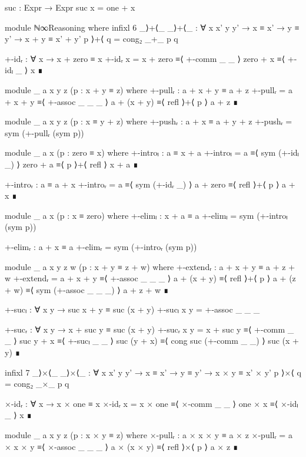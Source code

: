 \begin{code}[hide]
  suc : Expr → Expr
  suc x = one + x

  module ℕ∞Reasoning where
    infixl 6 _⟩+⟨_
    _⟩+⟨_ : ∀ {x x' y y'} → x ≡ x' → y ≡ y' → x + y ≡ x' + y'
    p ⟩+⟨ q = cong₂ _+_ p q

    +-idᵣ : ∀ x → x + zero ≡ x
    +-idᵣ x =
      x + zero ≡⟨ +-comm _ _ ⟩
      zero + x ≡⟨ +-idₗ _ ⟩
      x        ∎

    module _ {a x y z} (p : x + y ≡ z) where
      +-pullᵣ : a + x + y ≡ a + z
      +-pullᵣ =
        a + x + y   ≡⟨ +-assoc _ _ _ ⟩
        a + (x + y) ≡⟨ refl ⟩+⟨ p ⟩
        a + z       ∎

    module _ {a x y z} (p : x ≡ y + z) where
      +-pushᵣ : a + x ≡ a + y + z
      +-pushᵣ = sym (+-pullᵣ (sym p))

    module _ {a x} (p : zero ≡ x) where
      +-introₗ : a ≡ x + a
      +-introₗ =
        a        ≡⟨ sym (+-idₗ _) ⟩
        zero + a ≡⟨ p ⟩+⟨ refl ⟩
        x + a    ∎

      +-introᵣ : a ≡ a + x
      +-introᵣ =
        a        ≡⟨ sym (+-idᵣ _) ⟩
        a + zero ≡⟨ refl ⟩+⟨ p ⟩
        a + x    ∎

    module _ {a x} (p : x ≡ zero) where
      +-elimₗ : x + a ≡ a
      +-elimₗ = sym (+-introₗ (sym p))

      +-elimᵣ : a + x ≡ a
      +-elimᵣ = sym (+-introᵣ (sym p))

    module _ {a x y z w} (p : x + y ≡ z + w) where
      +-extendᵣ : a + x + y ≡ a + z + w
      +-extendᵣ =
        a + x + y   ≡⟨ +-assoc _ _ _ ⟩
        a + (x + y) ≡⟨ refl ⟩+⟨ p ⟩
        a + (z + w) ≡⟨ sym (+-assoc _ _ _) ⟩
        a + z + w   ∎

    +-sucₗ : ∀ x y → suc x + y ≡ suc (x + y)
    +-sucₗ x y = +-assoc _ _ _

    +-sucᵣ : ∀ x y → x + suc y ≡ suc (x + y)
    +-sucᵣ x y =
      x + suc y   ≡⟨ +-comm _ _ ⟩
      suc y + x   ≡⟨ +-sucₗ _ _ ⟩
      suc (y + x) ≡⟨ cong suc (+-comm _ _) ⟩
      suc (x + y) ∎

    infixl 7 _⟩×⟨_
    _⟩×⟨_ : ∀ {x x' y y'} → x ≡ x' → y ≡ y' → x × y ≡ x' × y'
    p ⟩×⟨ q = cong₂ _×_ p q

    ×-idᵣ : ∀ x → x × one ≡ x
    ×-idᵣ x =
      x × one ≡⟨ ×-comm _ _ ⟩
      one × x ≡⟨ ×-idₗ _ ⟩
      x       ∎

    module _ {a x y z} (p : x × y ≡ z) where
      ×-pullᵣ : a × x × y ≡ a × z
      ×-pullᵣ =
        a × x × y   ≡⟨ ×-assoc _ _ _ ⟩
        a × (x × y) ≡⟨ refl ⟩×⟨ p ⟩
        a × z       ∎


\end{code}

